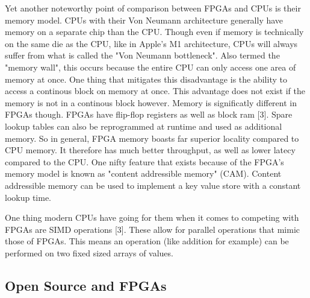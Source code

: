 \documentclass{article}
\begin{document}
    Yet another noteworthy point of comparison between FPGAs and CPUs is their memory model.
    CPUs with their Von Neumann architecture generally have memory on a separate chip
    than the CPU. Though even if memory is technically on the same die as the CPU, like in Apple's
    M1 architecture, CPUs will always suffer from what is called the "Von Neumann bottleneck".
    Also termed the "memory wall", this occurs because the entire CPU can only access one area
    of memory at once. One thing that mitigates this disadvantage is the ability to
    access a continous block on memory at once. This advantage does not exist if the memory
    is not in a continous block however. Memory is significatly different in FPGAs though.
    FPGAs have flip-flop registers as well as block ram [3]. Spare lookup tables can
    also be reprogrammed at runtime and used as additional memory. So in general, FPGA memory
    boasts far superior locality compared to CPU memory. It therefore has much better
    throughput, as well as lower latecy compared to the CPU.
    One nifty feature that exists because of the FPGA's memory model is known as
    "content addressible memory" (CAM). Content addressible memory can be used
    to implement a key value store with a constant lookup time.

    One thing modern CPUs have going for them when it comes to competing with FPGAs are
    SIMD operations [3]. These allow for parallel operations that mimic those of FPGAs.
    This means an operation (like addition for example) can be performed on two fixed
    sized arrays of values.

    \subsection{Open Source and FPGAs}
\end{document}
